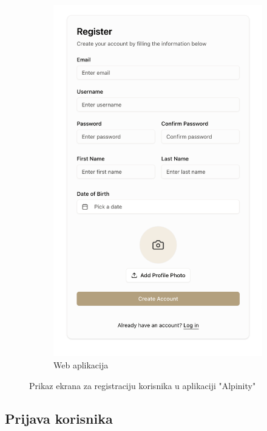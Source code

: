 \begin{figure}[H]
\begin{subfigure}{.5\textwidth}
  \centering
  \includegraphics[width=1\linewidth]{images/implementacija/web/register.png}
  \caption{Web aplikacija}
  \label{fig:registracija2}
\end{subfigure}
\caption{Prikaz ekrana za registraciju korisnika u aplikaciji "Alpinity"}
\label{fig:registracija_usporedba}
\end{figure}

\subsection{Prijava korisnika}


